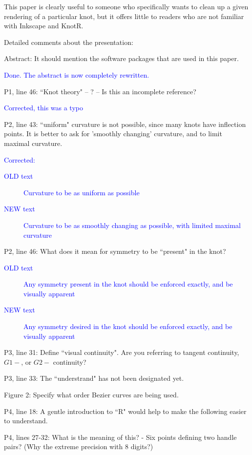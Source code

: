 \documentclass[12pt]{article}
\begin{document}
This paper is clearly useful to someone who specifically wants to
clean up a given rendering of a particular knot, but it offers little
to readers who are not familiar with Inkscape and KnotR.


Detailed comments about the presentation:

Abstract: It should mention the software packages that are used in
this paper.

\textcolor{blue}{Done.  The abstract is now completely rewritten.}

P1, line 46:  ``Knot theory" -- ?  -- Is this an incomplete reference?

\textcolor{blue}{Corrected, this was a typo}

P2, line 43: ``uniform" curvature is not possible, since many knots
have inflection points.  It is better to ask for 'smoothly changing'
curvature, and to limit maximal curvature.

\textcolor{blue}{Corrected:
  \begin{description}
  \item[OLD text] Curvature to be as uniform as possible
\item[NEW text] Curvature to be as smoothly changing as possible, with
  limited maximal curvature
  \end{description}
}
  


P2, line 46: What does it mean for symmetry to be ``present" in the
knot?

\textcolor{blue}{
  \begin{description}
  \item[OLD text] Any symmetry present in the knot should be enforced exactly, and be visually apparent
\item[NEW text] Any symmetry desired in the knot should be enforced exactly, and be visually apparent
  \end{description}
}


P3, line 31: Define ``visual continuity".  Are you referring to tangent
continuity, $G1-$, or $G2-$ continuity?

P3, line 33:  The ``understrand" has not been designated yet.

Figure 2:  Specify what order Bezier curves are being used.

P4, line 18: A gentle introduction to ``R" would help to make the
following easier to understand.

P4, lines 27-32: What is the meaning of this? - Six points defining
two handle pairs?  (Why the extreme precision with 8 digits?)
\end{document}
